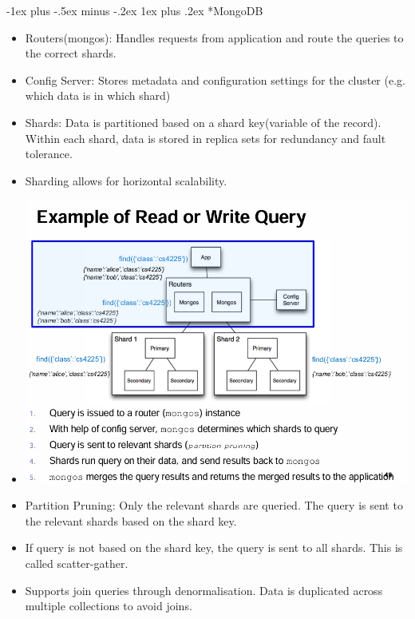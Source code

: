 \documentclass[10pt, landscape]{article}
\makeatletter
\renewcommand{\subsubsection}{\@startsection{subsubsection}{3}{0mm}%
  {-1ex plus -.5ex minus -.2ex}%
  {1ex plus .2ex}%
{\normalfont\small\bfseries}}%
\makeatother
\begin{document}
\begin{multicols*}{4}
  \subsubsection*{MongoDB}
  \begin{itemize}
    \item Routers(mongos): Handles requests from application and route the queries to the correct shards.
    \item Config Server: Stores metadata and configuration settings for the cluster (e.g. which data is in which shard)
    \item Shards: Data is partitioned based on a shard key(variable of the record). Within each shard, data is stored in replica sets for redundancy and fault tolerance.
    \item Sharding allows for horizontal scalability.
    \item \includegraphics[width=0.95\linewidth]{mongo_db_read_example.png}
    \item Partition Pruning: Only the relevant shards are queried. The query is sent to the relevant shards based on the shard key.
    \item If query is not based on the shard key, the query is sent to all shards. This is called scatter-gather.
    \item Supports join queries through denormalisation. Data is duplicated across multiple collections to avoid joins.
  \end{itemize}


\end{multicols*}
\end{document}
